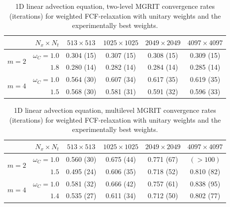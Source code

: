 \documentclass[VANCOUVER,STIX1COL]{WileyNJD-v2}
\begin{document}
\begin{table}[h!]
	\centering
	\begin{tabular}{l r|c|c|c|c}
		
		& $N_x \times N_t$ & $513 \times 513$ & $1025 \times 1025$ & $2049 \times 2049$ & $4097 \times 4097$ \\ \toprule
		\multirow{2}{*}{$m=2$} & $\omega_C = 1.0$                   & 0.304 (15) & 0.307 (15) & 0.308 (15) & 0.309 (15) \\ 
		& $1.8$                                                     & 0.280 (14) & 0.282 (14) & 0.284 (14) & 0.285 (14) \\ \midrule
		\multirow{2}{*}{$m=4$} & $\omega_C =1.0$                    & 0.564 (30) & 0.607 (34) & 0.617 (35) & 0.619 (35) \\ 
		& $1.5$                                                     & 0.568 (30) & 0.581 (31) & 0.591 (32) & 0.596 (33) \\ \bottomrule
	\end{tabular}
	\caption{1D linear advection equation, two-level MGRIT convergence rates (iterations) for weighted FCF-relaxation with unitary weights and the  experimentally best weights.}
	\label{tab:1D Advc results Two-level}
\end{table}

\begin{table}[h!]
	\centering
	\begin{tabular}{c r|c|c|c|c}
		&$N_x \times N_t$ & $513 \times 513$ & $1025 \times 1025$ & $2049 \times 2049$ & $4097 \times 4097$ \\ \toprule 
		\multirow{2}{*}{$m=2$} &   $\omega_C = 1.0$                 & 0.560 (30) & 0.675 (44) & 0.771 (67) & $(>100)$ \\ 
		& $1.5$                                                     & 0.495 (24) & 0.606 (35) & 0.718 (52) & 0.810 (82) \\ \midrule
		\multirow{2}{*}{$m=4$} & $\omega_C = 1.0$                   & 0.581 (32) & 0.666 (42) & 0.757 (61) & 0.838 (95) \\ 
		& $1.4$                                                     & 0.535 (27) & 0.611 (34) & 0.712 (50) & 0.802 (77) \\ \bottomrule
	\end{tabular}
	\caption{1D linear advection equation, multilevel MGRIT convergence rates (iterations) for weighted FCF-relaxation with unitary weights and the experimentally best weights.}
	\label{tab:1D Advc results Multilevel}
\end{table}
\end{document}
